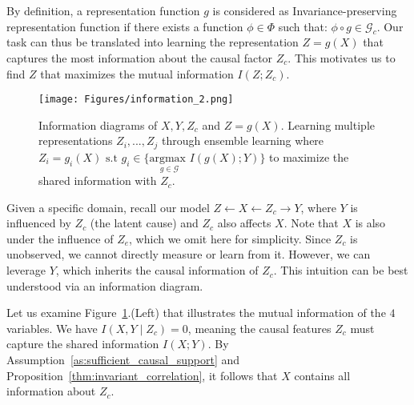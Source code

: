 

 
By definition, a representation function $g$ is considered as Invariance-preserving representation function if there exists a function $\phi\in \Phi$ such that:
$\phi\circ g \in \mathcal{G}_c$. Our task can thus be translated into learning the representation $Z=g(X)$ that captures the most information about the causal factor $Z_c$. This motivates us to find $Z$ that maximizes the mutual information $I(Z; Z_c)$.  

\begin{figure}[h!]
    \centering
    \texttt{[image: Figures/information\_2.png]}
    \caption{Information diagrams of $X, Y, Z_c$ and $Z=g(X)$. Learning multiple representations $Z_{i},...,Z_{j}$ through ensemble learning where $ Z_i= g_i(X)\text{ s.t }g_i \in \{\underset{g\in \mathcal{G}}{\text{argmax }}I(g(X);Y)\}$ to maximize the shared information with $Z_c$.}
    \label{fig:info}
\end{figure}


Given a specific domain, recall our model $Z\leftarrow X \leftarrow Z_c \rightarrow Y$, where $Y$ is influenced by $Z_c$ (the latent cause) and $Z_c$ also affects $X$. Note that $X$ is also under the influence of $Z_e$, which we omit here for simplicity. Since $Z_c$ is unobserved, we cannot directly measure or learn from it. However, we can leverage $Y$, which inherits the causal information of $Z_c$. This intuition can be best understood via an information diagram. 

Let us examine Figure~\ref{fig:info}.(Left) that illustrates the mutual information of the $4$ variables. We have $I(X,Y \mid Z_c)=0$, meaning the causal features $Z_c$ must capture the shared information $I(X;Y)$. By Assumption~\ref{as:sufficient_causal_support} and Proposition~\ref{thm:invariant_correlation}, it follows that $X$ contains all information about $Z_c$.

